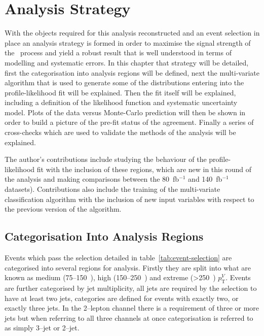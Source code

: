 \chapter{Analysis Strategy}%
\label{ch:strategy}

With the objects required for this analysis reconstructed and an event selection
in place an analysis strategy is formed in order to maximise the signal strength
of the \VHbb\ process and yield a robust result that is well understood in terms
of modelling and systematic errors. In this chapter that strategy will be
detailed, first the categorisation into analysis regions will be defined, next
the multi-variate algorithm that is used to generate some of the distributions
entering into the profile-likelihood fit will be explained. Then the fit itself
will be explained, including a definition of the likelihood function and
systematic uncertainty model. Plots of the data versus Monte-Carlo prediction
will then be shown in order to build a picture of the pre-fit status of the
agreement. Finally a series of cross-checks which are used to validate the
methods of the analysis will be explained.

The author's contributions include studying the behaviour of the
profile-likelihood fit with the inclusion of these regions, which are new in
this round of the analysis and making comparisons between the 80~fb$^{-1}$ and
140~fb$^{-1}$ datasets). Contributions also include the training of the
multi-variate classification algorithm with the inclusion of new input variables
with respect to the previous version of the algorithm.

\section{Categorisation Into Analysis Regions}
\label{sec:ana-regions}

Events which pass the selection detailed in table~\ref{tab:event-selection} are
categorised into several regions for analysis. Firstly they are split into what
are known as medium (75--150~\GeV), high (150--250~\GeV) and extreme (>250~\GeV)
$p_{\mathrm{T}}^{V}$. Events are further categorised by jet multiplicity, all jets are
required by the selection to have at least two jets, categories are defined for
events with exactly two, or exactly three jets. In the 2--lepton channel there
is a requirement of three or more jets but when referring to all three channels
at once categorisation is referred to as simply 3--jet or 2--jet.

